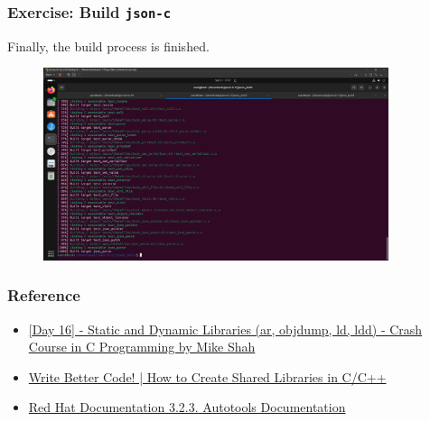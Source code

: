 \begin{frame}
    \frametitle{Exercise: Build \texttt{json-c}}

    Finally, the build process is finished.

    \begin{figure}[H]
        \centering
        \includegraphics[width=0.9\textwidth]{../figure/jsonc_build_6.png}
    \end{figure}
\end{frame}

\begin{frame}
    \frametitle{Reference}

    \begin{itemize}
        \item \href{https://www.youtube.com/watch?v=YtiPCPtmZrs}{{[}Day 16{]} - Static and Dynamic Libraries (ar, objdump, ld, ldd) - Crash Course in C Programming by Mike Shah}
        \item \href{https://www.youtube.com/watch?v=Slfwk28vhws}{Write Better Code! | How to Create Shared Libraries in C/C++}
        \item \href{https://docs.redhat.com/en/documentation/red_hat_enterprise_linux/6/html/developer_guide/cmd-autotools-upstreamdocs\#cmd-autotools-upstreamdocs}{Red Hat Documentation 3.2.3. Autotools Documentation}
    \end{itemize}
\end{frame}
